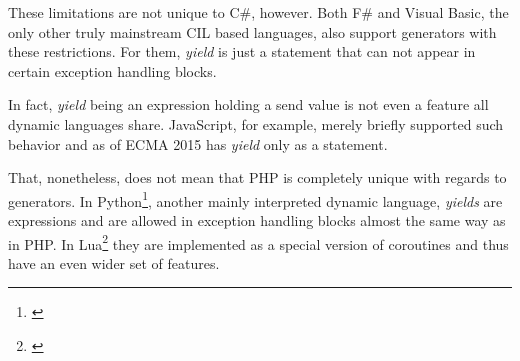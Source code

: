 These limitations are not unique to C\#, however. Both F\# and Visual Basic, the only other truly mainstream CIL based languages, also support generators with these restrictions. For them, \emph{yield} is just a statement that can not appear in certain exception handling blocks.

In fact, \emph{yield} being an expression holding a send value is not even a feature all dynamic languages share. JavaScript, for example, merely briefly supported {\citep{ECMAYield}} such behavior and as of ECMA 2015 has \emph{yield} only as a statement.

That, nonetheless, does not mean that PHP is completely unique with regards to generators. In Python\footnote{\citep{PythonYield}}, another mainly interpreted dynamic language, \emph{yields} are expressions and are allowed in exception handling blocks almost the same way as in PHP. In Lua\footnote{\citep{LUAYield}} they are implemented as a special version of coroutines and thus have an even wider set of features.




